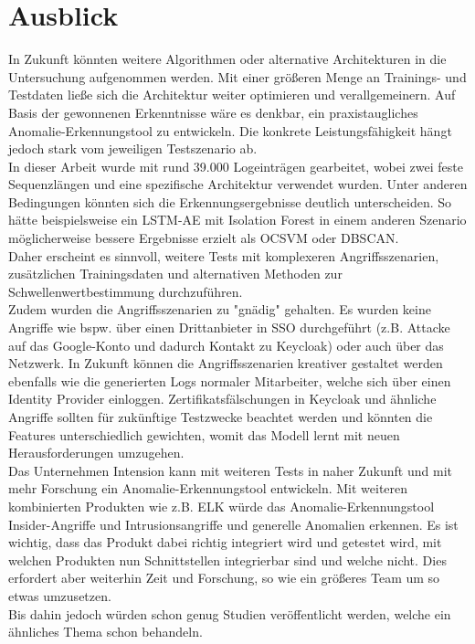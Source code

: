 \documentclass[a4paper,12pt]{article}
\let\footnote=\endnote
\begin{document}
	\section{Ausblick}
	In Zukunft könnten weitere Algorithmen oder alternative Architekturen in die Untersuchung aufgenommen werden. Mit einer größeren Menge an Trainings- und Testdaten ließe sich die Architektur weiter optimieren und verallgemeinern. Auf Basis der gewonnenen Erkenntnisse wäre es denkbar, ein praxistaugliches Anomalie-Erkennungstool zu entwickeln. Die konkrete Leistungsfähigkeit hängt jedoch stark vom jeweiligen Testszenario ab.  
	\\[0.5em]
	In dieser Arbeit wurde mit rund 39.000 Logeinträgen gearbeitet, wobei zwei feste Sequenzlängen und eine spezifische Architektur verwendet wurden. Unter anderen Bedingungen könnten sich die Erkennungsergebnisse deutlich unterscheiden. So hätte beispielsweise ein LSTM-AE mit Isolation Forest in einem anderen Szenario möglicherweise bessere Ergebnisse erzielt als OCSVM oder DBSCAN.  
	\\[0.5em]
	Daher erscheint es sinnvoll, weitere Tests mit komplexeren Angriffsszenarien, zusätzlichen Trainingsdaten und alternativen Methoden zur Schwellenwertbestimmung durchzuführen.
	\\[0.5em]
	Zudem wurden die Angriffsszenarien zu "gnädig" gehalten. Es wurden keine Angriffe wie bspw. über einen Drittanbieter in SSO durchgeführt (z.B. Attacke auf das Google-Konto und dadurch Kontakt zu Keycloak) oder auch über das Netzwerk. In Zukunft können die Angriffsszenarien kreativer gestaltet werden ebenfalls wie die generierten Logs normaler Mitarbeiter, welche sich über einen Identity Provider einloggen. Zertifikatsfälschungen in Keycloak und ähnliche Angriffe sollten für zukünftige Testzwecke beachtet werden und könnten die Features unterschiedlich gewichten, womit das Modell lernt mit neuen Herausforderungen umzugehen.
	\\[0.5em]
	Das Unternehmen Intension kann mit weiteren Tests in naher Zukunft und mit mehr Forschung ein Anomalie-Erkennungstool entwickeln. Mit weiteren kombinierten Produkten wie z.B. ELK \footnote{https://www.elastic.co/elastic-stack/} würde das Anomalie-Erkennungstool Insider-Angriffe und Intrusionsangriffe und generelle Anomalien erkennen. Es ist wichtig, dass das Produkt dabei richtig integriert wird und getestet wird, mit welchen Produkten nun Schnittstellen integrierbar sind und welche nicht. Dies erfordert aber weiterhin Zeit und Forschung, so wie ein größeres Team um so etwas umzusetzen.
	\\[0.5em]
	Bis dahin jedoch würden schon genug Studien veröffentlicht werden, welche ein ähnliches Thema schon behandeln.
	
\end{document}
